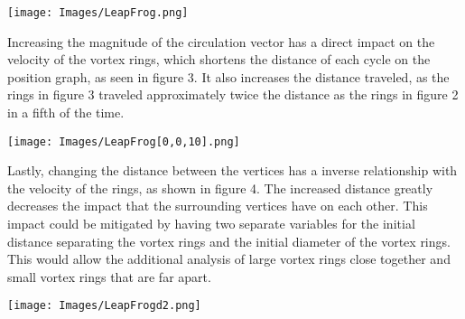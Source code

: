 \documentclass{article}
\begin{document}
\begin{multicols}{2}
\begin{center}
\resizebox{7cm}{!} {\texttt{[image: Images/LeapFrog.png]}}

\caption{Figure 2: Position graph of leap frogging vortex rings with a circulation of [0,0,1], initial separation distance of 1 unit, time step of .001 seconds, and time duration of 40 seconds}
\end{center}

Increasing the magnitude of the circulation vector has a direct impact on the velocity of the vortex rings, which shortens the distance of each cycle on the position graph, as seen in figure 3. It also increases the distance traveled, as the rings in figure 3 traveled approximately twice the distance as the rings in figure 2 in a fifth of the time.

\begin{center}

\resizebox{7cm}{!} {\texttt{[image: Images/LeapFrog[0,0,10].png]}}

\caption{Figure 3: Position graph of leap frogging vortex rings with a circulation of [0,0,10], initial separation distance of 1 unit, time step of .001 seconds, and time duration of 8 seconds}
\end{center}

Lastly, changing the distance between the vertices has a inverse relationship with the velocity of the rings, as shown in figure 4. The increased distance greatly decreases the impact that the surrounding vertices have on each other. This impact could be mitigated by having two separate variables for the initial distance separating the vortex rings and the initial diameter of the vortex rings. This would allow the additional analysis of large vortex rings close together and small vortex rings that are far apart.


\begin{center}
\resizebox{7cm}{!} {\texttt{[image: Images/LeapFrogd2.png]}}

\caption{Figure 4: Position graph of leap frogging vortex rings with a circulation of [0,0,1], initial separation distance of 2 units, time step of .001 seconds, and time duration of 100 seconds}
\end{center}


\end{multicols}
\end{document}
